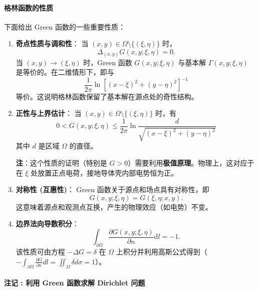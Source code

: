 \documentclass[12pt,a4paper]{ctexart}
\begin{document}
	\paragraph{格林函数的性质}
	下面给出 Green 函数的一些重要性质：
	
	\begin{enumerate}
		\item[$1^\circ$] \textbf{奇点性质与调和性}：
		当 $(x,y) \in \Omega \setminus \{ (\xi,\eta) \}$ 时，
		\[
		\Delta_{(x,y)} G(x,y; \xi,\eta) = 0.
		\]
		当 $(x,y) \to (\xi,\eta)$ 时，Green 函数 $G(x,y; \xi,\eta)$ 与基本解 $\Gamma(x,y; \xi,\eta)$ 是等价的。在二维情形下，即与
		\[
		\frac{1}{2\pi} \ln \left[ (x-\xi)^2 + (y-\eta)^2 \right]^{-1}
		\]
		等价。这说明格林函数保留了基本解在源点处的奇性结构。
		
		\item[$2^\circ$] \textbf{正性与上界估计}：
		当 $(x,y) \in \Omega \setminus \{ (\xi,\eta) \}$ 时，有
		\begin{equation}
			0 < G(x,y; \xi,\eta) \le \frac{1}{2\pi} \ln \frac{d}{\sqrt{(x-\xi)^2 + (y-\eta)^2}}
		\end{equation}
		其中 $d$ 是区域 $\Omega$ 的直径。
		
		\textbf{注}：这个性质的证明（特别是 $G>0$）需要利用\textbf{极值原理}。物理上，这对应于在 $\xi$ 处放置正点电荷，接地导体壳内部电势恒为正。
		
		\item[$3^\circ$] \textbf{对称性 (互惠性)}：
		Green 函数关于源点和场点具有对称性，即
		\begin{equation}
			G(x,y; \xi,\eta) = G(\xi,\eta; x,y).
		\end{equation}
		这意味着源点和观测点互换，产生的物理效应（如电势）不变。
		
		\item[$4^\circ$] \textbf{边界法向导数积分}：
		\begin{equation}
			\int_{\partial \Omega} \frac{\partial G(x,y; \xi,\eta)}{\partial n} \mathrm{d}l = -1.
		\end{equation}
		该性质可由方程 $-\Delta G = \delta$ 在 $\Omega$ 上积分并利用高斯公式得到（$-\int_{\partial \Omega} \frac{\partial G}{\partial n} dl = \iint_\Omega \delta d\sigma = 1$）。
	\end{enumerate}
	
	\paragraph{注记 : 利用 Green 函数求解 Dirichlet 问题}
	
\end{document}
